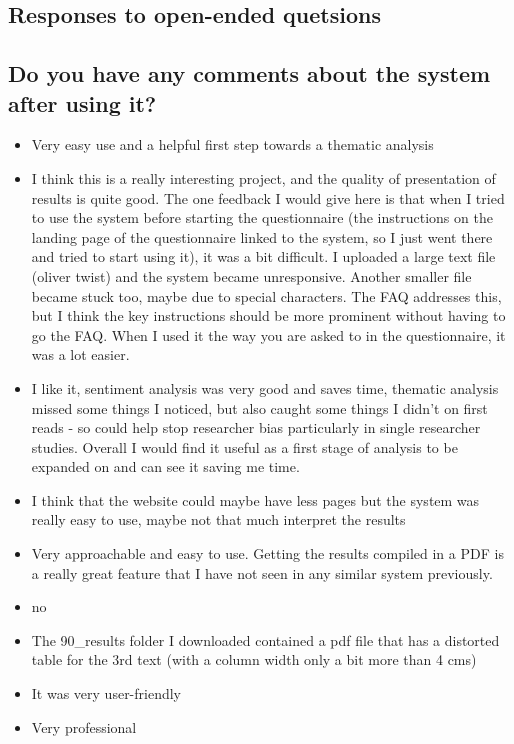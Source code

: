 \documentclass{l4proj}
\begin{document}
\begin{appendices}
\section{Responses to open-ended quetsions}
\label{appendix:user_eval_qual}

\subsection{Do you have any comments about the system after using it?}
\begin{itemize}
    \item Very easy use and a helpful first step towards a thematic analysis
    \item I think this is a really interesting project, and the quality of presentation of results is quite good. The one feedback I would give here is that when I tried to use the system before starting the questionnaire (the instructions on the landing page of the questionnaire linked to the system, so I just went there and tried to start using it), it was a bit difficult. I uploaded a large text file (oliver twist) and the system became unresponsive. Another smaller file became stuck too, maybe due to special characters. The FAQ addresses this, but I think the key instructions should be more prominent without having to go the FAQ. When I used it the way you are asked to in the questionnaire, it was a lot easier.
    \item I like it, sentiment analysis was very good and saves time, thematic analysis missed some things I noticed, but also caught some things I didn't on first reads - so could help stop researcher bias particularly in single researcher studies. Overall I would find it useful as a first stage of analysis to be expanded on and can see it saving me time.
    \item I think that the website could maybe have less pages but the system was really easy to use, maybe not that much interpret the results
    \item Very approachable and easy to use. Getting the results compiled in a PDF is a really great feature that I have not seen in any similar system previously.
    \item no
    \item The 90\_results folder I downloaded contained a pdf file that has a distorted table for the 3rd text (with a column width only a bit more than 4 cms)
    \item It was very user-friendly 
    \item Very professional
    

\end{itemize}
\end{appendices}
\end{document}
